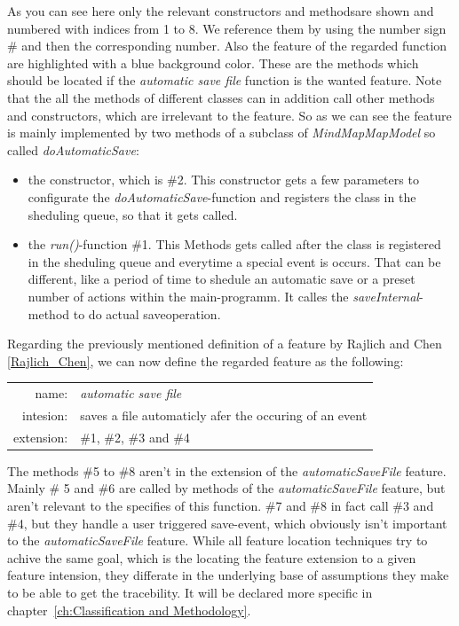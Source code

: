 As you can see here only the relevant constructors and methodsare shown and numbered with indices from 1 to 8. We reference them by using the number sign \# and then the corresponding number. Also the feature of the regarded function are highlighted with a blue background color. These are the methods which should be located if the \emph{automatic save file} function is the wanted feature. Note that the all the methods of different classes can in addition call other methods and constructors, which are irrelevant to the feature.
So as we can see the feature is mainly implemented by two methods of a subclass of \emph{MindMapMapModel} so called \emph{doAutomaticSave}:
\begin{itemize} 
\item the constructor, which is \#2. This constructor gets a few parameters to configurate the \emph{doAutomaticSave}-function and registers the class in the sheduling queue, so that it gets called.
\item the \emph{run()}-function \#1. This Methods gets called after the class is registered in the sheduling queue and everytime a special event is occurs. That can be different, like a period of time to shedule an automatic save or a preset number of actions within the main-programm. It calles the \emph{saveInternal}-method to do actual saveoperation.
\end{itemize}

Regarding the previously mentioned definition of a feature by Rajlich and Chen \ref{Rajlich_Chen}, we can now define the regarded feature as the following: \newline
\begin{tabular}{ r  l }
  name: & \emph{automatic save file}  \\
  intesion: & saves a file automaticly afer the occuring of an event\\
 extension: & \#1,  \#2, \#3 and \#4\\
\end{tabular}
The methods \#5 to \#8 aren't in the extension of the \emph{automaticSaveFile} feature.
Mainly \# 5 and \#6 are called by methods of the \emph{automaticSaveFile} feature, but aren't relevant to the specifies of this function.
\#7 and \#8 in fact call \#3 and \#4, but they handle a user triggered save-event, which obviously isn't important to the \emph{automaticSaveFile} feature.
\newline \newline
While all feature location techniques try to achive the same goal, which is the locating the feature extension to a given feature intension, they differate in the underlying base of assumptions they make to be able to get the tracebility. It will be declared more specific in chapter~\ref{ch:Classification and Methodology}. 
